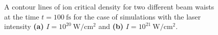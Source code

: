 \begin{figure}[h!]
	\centering
	\hspace{1mm}
	\caption{A contour lines of ion critical density for two different beam waists at the time $ t = 100 \ \mathrm{fs} $ for the case of simulations with the laser intensity \textbf{(a)} $ I = 10^{20} \ \mathrm{W/cm^2} $ and \textbf{(b)} $ I = 10^{21} \ \mathrm{W/cm^2} $.}
	\label{fig:15}
\end{figure}

